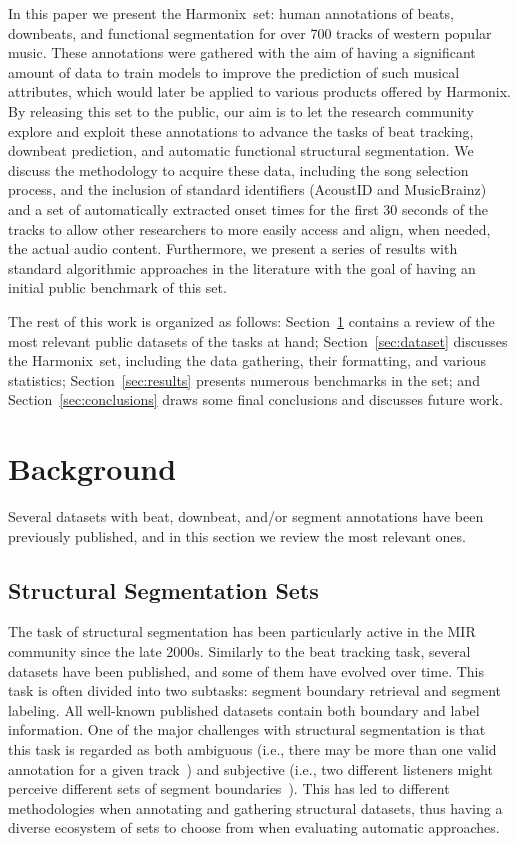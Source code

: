\documentclass{article}
\newcommand{\setName}{Harmonix}
\begin{document}
In this paper we present the \setName~set: human annotations of beats, downbeats, and functional segmentation for over 700 tracks of western popular music.
These annotations were gathered with the aim of having a significant amount of data to train models to improve the prediction of such musical attributes, which would later be applied to various products offered by Harmonix.
By releasing this set to the public, our aim is to let the research community explore and exploit these annotations to advance the tasks of beat tracking, downbeat prediction, and automatic functional structural segmentation.
We discuss the methodology to acquire these data, including the song selection process, and the inclusion of standard identifiers (AcoustID and MusicBrainz) and a set of automatically extracted onset times for the first 30 seconds of the tracks to allow other researchers to more easily access and align, when needed, the actual audio content.
Furthermore, we present a series of results with standard algorithmic approaches in the literature with the goal of having an initial public benchmark of this set.

The rest of this work is organized as follows: Section~\ref{sec:background} contains a review of the most relevant public datasets of the tasks at hand; Section~\ref{sec:dataset} discusses the \setName~set, including the data gathering, their formatting, and various statistics; Section~\ref{sec:results} presents numerous benchmarks in the set; and Section~\ref{sec:conclusions} draws some final conclusions and discusses future work.
%
\section{Background}\label{sec:background}

Several datasets with beat, downbeat, and/or segment annotations have been previously published, and in this section we review the most relevant ones.



\subsection{Structural Segmentation Sets}\label{sub:structsegm}

The task of structural segmentation has been particularly active in the MIR community since the late 2000s.
Similarly to the beat tracking task, several datasets have been published, and some of them have evolved over time.
This task is often divided into two subtasks: segment boundary retrieval and segment labeling.
All well-known published datasets contain both boundary and label information.
One of the major challenges with structural segmentation is that this task is regarded as both ambiguous (i.e., there may be more than one valid annotation for a given track~\cite{McFee2017}) and subjective (i.e., two different listeners might perceive different sets of segment boundaries~\cite{Bruderer2009}).
This has led to different methodologies when annotating and gathering structural datasets, thus having a diverse ecosystem of sets to choose from when evaluating automatic approaches.
\end{document}
